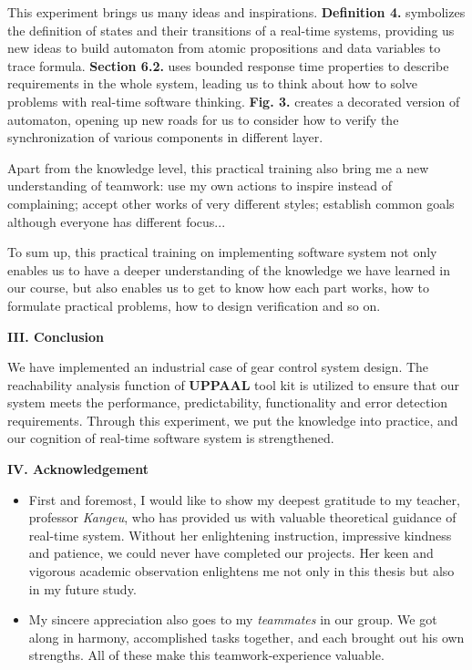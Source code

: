 \documentclass[a4paper]{article}
\begin{document}
\large{
This experiment brings us many ideas and inspirations. \textbf{Definition 4.} symbolizes the definition of states and their transitions of a real-time systems, providing us new ideas to build automaton from atomic propositions and data variables to trace formula. \textbf{Section 6.2.} uses bounded response time properties to describe requirements in the whole system, leading us to think about how to solve problems with real-time software thinking. \textbf{Fig. 3.} creates a decorated version of automaton, opening up new roads for us to consider how to verify the synchronization of various components in different layer. 

Apart from the knowledge level, this practical training also bring me a new understanding of teamwork: use my own actions to inspire instead of complaining; accept other works of very different styles; establish common goals although everyone has different focus...

To sum up, this practical training on implementing software system not only enables us to have a deeper understanding of the knowledge we have learned in our course, but also enables us to get to know how each part works, how to formulate practical problems, how to design verification and so on.}

\vspace{5mm}
\begin{center}
\LARGE\textbf{III. Conclusion} \\
\end{center}
\vspace{2mm}

\large{
We have implemented an industrial case of gear control system design. The reachability analysis function of \textbf{U\small{PPAAL}\large*} tool kit is utilized to ensure that our system meets the performance, predictability, functionality and error detection requirements. Through this experiment, we put the knowledge into practice, and our cognition of real-time software system is strengthened.}


\vspace{5mm}
\begin{center}
\LARGE\textbf{IV. Acknowledgement} \\
\end{center}
\vspace{.5mm}

\begin{itemize} \item{First and foremost, I would like to show my deepest gratitude to my teacher, professor \textit{Kangeu}, who has provided us with valuable theoretical guidance of real-time system. Without her enlightening instruction, impressive kindness and patience, we could never have completed our projects. Her keen and vigorous academic observation enlightens me not only in this thesis but also in my future study.}
\item{My sincere appreciation also goes to my \textit{teammates} in our group. We got along in harmony, accomplished tasks together, and each brought out his own strengths. All of these make this teamwork-experience valuable.}
\end{itemize}
\end{document}
